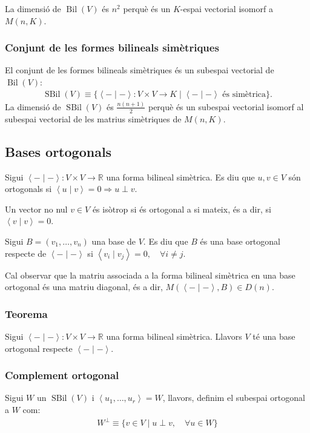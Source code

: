 La dimensió de $\operatorname{Bil} (V)$ és $n^{2}$ perquè és un $K$-espai vectorial isomorf a $M(n,K)$.

\subsubsection*{Conjunt de les formes bilineals simètriques}
El conjunt de les formes bilineals simètriques és un subespai vectorial de $\operatorname{Bil} (V)$:
\begin{align}
    \operatorname{SBil} (V) \equiv \{ \left< - \mid - \right>: V \times V \to K \mid \left< - \mid - \right> \text{ és simètrica} \}. 
\end{align}
La dimensió de $\operatorname{SBil} (V)$ és $\frac{n(n+1)}{2}$ perquè és un subespai vectorial isomorf al subespai vectorial de les matrius simètriques de $M(n,K)$.

\subsection{Bases ortogonals}
Sigui $\left< - \mid - \right>: V \times V \to \mathbb{R}$ una forma bilineal simètrica. Es diu que $u, v \in V$ són ortogonals si $\left< u \mid v \right> = 0 \Rightarrow u \perp v$.

Un vector no nul $v \in V$ és isòtrop si és ortogonal a si mateix, és a dir, si $\left< v \mid v \right> = 0$.

Sigui $B = (v_{1}, \dots , v_{n})$ una base de $V$. Es diu que $B$ és una base ortogonal respecte de $\left< - \mid - \right>$ si $\left< v_{i} \mid v_{j} \right> = 0, \quad \forall i \neq j$.

Cal observar que la matriu associada a la forma bilineal simètrica en una base ortogonal és una matriu diagonal, és a dir, $M(\left< - \mid - \right>, B) \in D(n)$.

\subsubsection*{Teorema}
Sigui $\left< - \mid - \right>: V \times V \to \mathbb{R}$ una forma bilineal simètrica. Llavors $V$ té una base ortogonal respecte $\left< - \mid - \right>$.

\subsubsection*{Complement ortogonal}
Sigui $W$ un $\operatorname{SBil} (V)$ i $\left< u_{1}, \dots , u_{r} \right> = W$, llavors, definim el subespai ortogonal a $W$ com:
\begin{align}
    W^{\perp} \equiv \{ v \in V \mid u \perp v, \quad \forall u \in W \}
\end{align}

